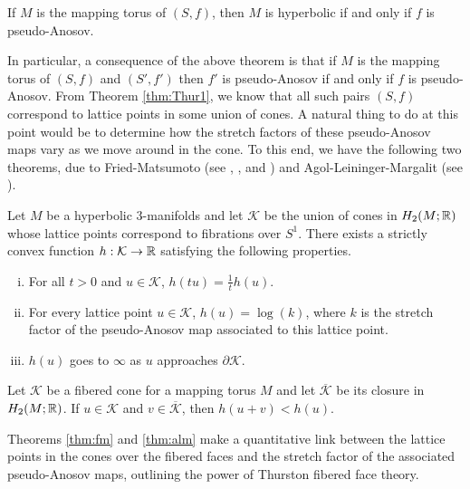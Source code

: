 \begin{thm}
  If $M$ is the mapping torus of $(S, f)$, then $M$ is hyperbolic if and only if $f$ is pseudo-Anosov.
\end{thm}

In particular, a consequence of the above theorem is that if $M$ is the mapping torus of $(S, f)$
and $(S', f')$ then $f'$ is pseudo-Anosov if and only if $f$ is pseudo-Anosov. From Theorem
\ref{thm:Thur1}, we know that all such pairs $(S, f)$ correspond to lattice points in some union of
cones. A natural thing to do at this point would be to determine how the stretch factors of these
pseudo-Anosov maps vary as we move around in the cone. To this end, we have the following two
theorems, due to Fried-Matsumoto (see \cite{fried1982flow}, \cite{fried1983transitive}, and
\cite{matsumoto1987topological}) and Agol-Leininger-Margalit (see \cite{agol6983pseudo}).

\begin{thm}
  \label{thm:fm}
  Let $M$ be a hyperbolic $3$-manifolds and let $\mathcal{K}$ be the union of cones in $H_2(M; \mathbb{R})$
  whose lattice points correspond to fibrations over $S^1$.  There exists a strictly convex function
  $h: \mathcal{K} \to \mathbb{R}$ satisfying the following properties.
  \begin{enumerate}[(i)]
  \item For all $t > 0$ and $u \in \mathcal{K}$, $h(tu) =  \frac{1}{t}h(u)$.
  \item For every lattice point $u \in \mathcal{K}$, $h(u) = \log(k)$, where $k$ is the stretch factor
    of the pseudo-Anosov map associated to this lattice point.
  \item $h(u)$ goes to $\infty$ as $u$ approaches $\partial \mathcal{K}$.
  \end{enumerate}
\end{thm}

\begin{thm}
  \label{thm:alm}
  Let $\mathcal{K}$ be a fibered cone for a mapping torus $M$ and let $\overline{\mathcal{K}}$ be its closure
  in $H_2(M;\mathbb{R})$. If $u \in \mathcal{K}$ and $v \in \overline{\mathcal{K}}$, then $h(u+v) < h(u)$.
\end{thm}
Theorems \ref{thm:fm} and \ref{thm:alm} make a quantitative link between the lattice points in the cones
over the fibered faces and the stretch factor of the associated pseudo-Anosov maps, outlining the power
of Thurston fibered face theory.

